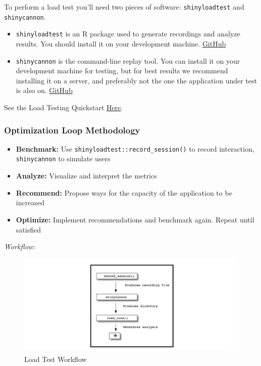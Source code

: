 \documentclass[]{book}
\providecommand{\tightlist}{%
  \setlength{\itemsep}{0pt}\setlength{\parskip}{0pt}}
\theoremstyle{definition}
\theoremstyle{definition}
\theoremstyle{definition}
\theoremstyle{remark}
\begin{document}
To perform a load test you'll need two pieces of software:
\texttt{shinyloadtest} and \texttt{shinycannon}.

\begin{itemize}
\tightlist
\item
  \texttt{shinyloadtest} is an R package used to generate recordings and
  analyze results. You should install it on your development machine.
  \href{https://github.com/rstudio/shinyloadtest}{GitHub}
\item
  \texttt{shinycannon} is the command-line replay tool. You can install
  it on your development machine for testing, but for best results we
  recommend installing it on a server, and preferably not the one the
  application under test is also on.
  \href{https://github.com/rstudio/shinycannon}{GitHub}
\end{itemize}

See the Load Testing Quickstart
\href{https://rstudio.github.io/shinyloadtest/\#quick-start}{Here}.

\hypertarget{optimization-loop-methodology}{%
\subsubsection{Optimization Loop
Methodology}\label{optimization-loop-methodology}}

\begin{itemize}
\tightlist
\item
  \textbf{Benchmark:} Use \texttt{shinyloadtest::record\_session()} to
  record interaction, \texttt{shinycannon} to simulate users
\item
  \textbf{Analyze:} Visualize and interpret the metrics
\item
  \textbf{Recommend:} Propose ways for the capacity of the application
  to be increased
\item
  \textbf{Optimize:} Implement recommendations and benchmark again.
  Repeat until satisfied
\end{itemize}

\emph{Workflow:}

\begin{figure}
\centering
\includegraphics{imgs/loadtesting/loadtest-workflow.png}
\caption{Load Test Workflow}
\end{figure}
\end{document}
